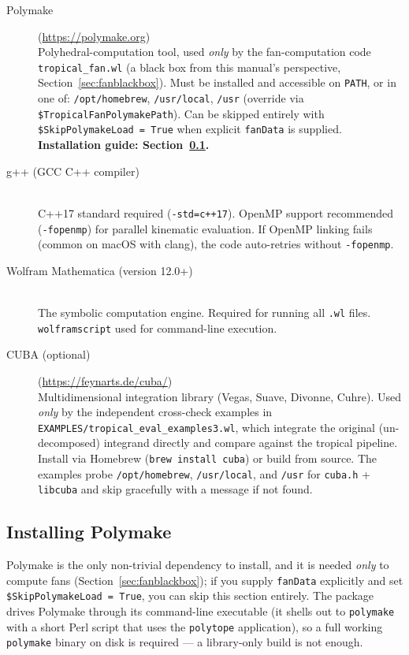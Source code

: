 \documentclass[11pt,a4paper]{article}
\begin{document}
\begin{description}
  \item[Polymake] (\url{https://polymake.org}) \\
    Polyhedral-computation tool, used \emph{only} by the fan-computation code \texttt{tropical\_fan.wl} (a black box from this manual's perspective, Section~\ref{sec:fanblackbox}). Must be installed and accessible on \texttt{PATH}, or in one of: \texttt{/opt/homebrew}, \texttt{/usr/local}, \texttt{/usr} (override via \texttt{\$TropicalFanPolymakePath}). Can be skipped entirely with \texttt{\$SkipPolymakeLoad = True} when explicit \texttt{fanData} is supplied. \textbf{Installation guide: Section~\ref{sec:polymake-install}.}

  \item[g++ (GCC C++ compiler)] ~\\
    C++17 standard required (\texttt{-std=c++17}). OpenMP support recommended (\texttt{-fopenmp}) for parallel kinematic evaluation. If OpenMP linking fails (common on macOS with clang), the code auto-retries without \texttt{-fopenmp}.

  \item[Wolfram Mathematica (version 12.0+)] ~\\
    The symbolic computation engine. Required for running all \texttt{.wl} files. \texttt{wolframscript} used for command-line execution.

  \item[CUBA (optional)] (\url{https://feynarts.de/cuba/}) \\
    Multidimensional integration library (Vegas, Suave, Divonne, Cuhre). Used \emph{only} by the independent cross-check examples in \texttt{EXAMPLES/tropical\_eval\_examples3.wl}, which integrate the original (un-decomposed) integrand directly and compare against the tropical pipeline. Install via Homebrew (\texttt{brew install cuba}) or build from source. The examples probe \texttt{/opt/homebrew}, \texttt{/usr/local}, and \texttt{/usr} for \texttt{cuba.h} + \texttt{libcuba} and skip gracefully with a message if not found.
\end{description}

\subsection{Installing Polymake}\label{sec:polymake-install}

Polymake is the only non-trivial dependency to install, and it is needed
\emph{only} to compute fans (Section~\ref{sec:fanblackbox}); if you supply
\texttt{fanData} explicitly and set \texttt{\$SkipPolymakeLoad = True}, you can
skip this section entirely. The package drives Polymake through its
command-line executable (it shells out to \texttt{polymake} with a short Perl
script that uses the \texttt{polytope} application), so a full working
\texttt{polymake} binary on disk is required --- a library-only build is not
enough.
\end{document}
